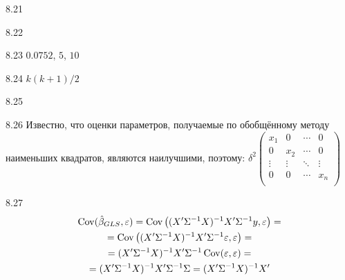 \protect \hypertarget {soln:8.21}{}
\begin{solution}{{8.21}}
\end{solution}
\protect \hypertarget {soln:8.22}{}
\begin{solution}{{8.22}}
\end{solution}
\protect \hypertarget {soln:8.23}{}
\begin{solution}{{8.23}}
$0.0752$, $5$, $10$
\end{solution}
\protect \hypertarget {soln:8.24}{}
\begin{solution}{{8.24}}
$k(k+1)/2$
\end{solution}
\protect \hypertarget {soln:8.25}{}
\begin{solution}{{8.25}}
\end{solution}
\protect \hypertarget {soln:8.26}{}
\begin{solution}{{8.26}}
Известно, что оценки параметров, получаемые по обобщённому методу наименьших квадратов, являются наилучшими, поэтому:
$\delta^2
\begin{pmatrix}
x_1     & 0      & \cdots & 0 \\
0       & x_2    & \cdots & 0 \\
\vdots  & \vdots & \ddots & \vdots \\
0       & 0      & \cdots & x_n \\
\end{pmatrix}$
\end{solution}
\protect \hypertarget {soln:8.27}{}
\begin{solution}{{8.27}}
\begin{multline*}
\operatorname{Cov}(\hat{\beta}_{GLS}, \varepsilon) = \operatorname{Cov} \left( (X' \Sigma^{-1} X)^{-1} X' \Sigma^{-1} y, \varepsilon \right) = \\
= \operatorname{Cov} \left( (X' \Sigma^{-1} X)^{-1} X' \Sigma^{-1} \varepsilon, \varepsilon \right) = \\
= (X' \Sigma^{-1} X)^{-1} X' \Sigma^{-1} \operatorname{Cov}(\varepsilon, \varepsilon) =\\
= (X' \Sigma^{-1} X)^{-1} X' \Sigma^{-1} \Sigma = (X' \Sigma^{-1} X)^{-1} X'
\end{multline*}
\end{solution}
\protect \hypertarget {soln:8.28}{}
